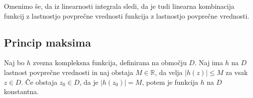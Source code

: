 \documentclass[mat1, tisk]{fmfdelo}
\begin{document}
    Omenimo še, da iz linearnosti integrala sledi, da je tudi linearna kombinacija funkcij z lastnostjo povprečne vrednosti funkcija z lastnostjo povprečne vrednosti. 


\subsection{Princip maksima}
    \begin{trditev}
        \label{pm_lpv}
        Naj bo $h$ zvezna kompleksna funkcija, definirana na območju $D$. Naj ima $h$ na $D$ lastnost povprečne vrednosti in naj obstaja $M \in \mathbb{R}$, da velja $|h(z)| \leq M$ za vsak $z \in D$. 
        Če obstaja $z_0 \in D$, da je $|h(z_0)| = M$, potem je funkcija $h$ na $D$ konstantna. 
    \end{trditev}
\end{document}
